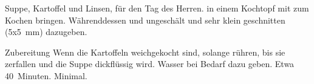 \begin{recipe}{Suppe, Kartoffel und Linsen, für den Tag des Herren.}
	 in einem Kochtopf mit
	 zum Kochen bringen. Währenddessen
	 und
	 ungeschält und sehr klein geschnitten (5x5~mm) dazugeben.
	\item[Zubereitung] Wenn die Kartoffeln weichgekocht sind, solange rühren, bis sie zerfallen und die Suppe dickflüssig wird.
	\hint Wasser bei Bedarf dazu geben. 
	\preparationtime Etwa 40~Minuten.
	\washingup Minimal.
\end{recipe}
